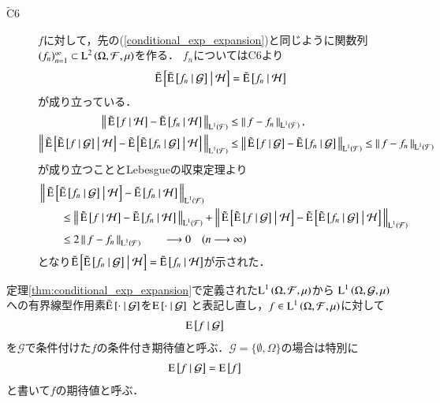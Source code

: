 \begin{prf}
\begin{description}
			\item[$\tilde{\mathrm{C}}$6]
				$f$に対して，先の(\ref{conditional_exp_expansion})と同じように関数列$(f_n)_{n=1}^{\infty} \subset \Lp{2}{\Omega,\mathcal{F},\mu}$を作る．
				$f_n$についてはC6より
				\begin{align}
					\tcexp{\tcexp{f_n}{\mathcal{G}}}{\mathcal{H}} = \tcexp{f_n}{\mathcal{H}}
				\end{align}
				が成り立っている．
				\begin{align}
					\Norm{ \tcexp{f}{\mathcal{H}} -  \tcexp{f_n}{\mathcal{H}}}{\Lp{1}{\mathcal{F}}}
					&\leq \Norm{f -  f_n}{\Lp{1}{\mathcal{F}}}, \\
					\Norm{ \tcexp{\tcexp{f}{\mathcal{G}}}{\mathcal{H}} -  \tcexp{\tcexp{f_n}{\mathcal{G}}}{\mathcal{H}}}{\Lp{1}{\mathcal{F}}}
					&\leq \Norm{ \tcexp{f}{\mathcal{G}} -  \tcexp{f_n}{\mathcal{G}} }{\Lp{1}{\mathcal{F}}}
					\leq \Norm{f -  f_n}{\Lp{1}{\mathcal{F}}}
				\end{align}
				が成り立つこととLebesgueの収束定理より
				\begin{align}
					&\Norm{ \tcexp{\tcexp{f_n}{\mathcal{G}}}{\mathcal{H}} - \tcexp{f_n}{\mathcal{H}} }{\Lp{1}{\mathcal{F}}} \\
					&\qquad\leq \Norm{ \tcexp{f}{\mathcal{H}} -  \tcexp{f_n}{\mathcal{H}}}{\Lp{1}{\mathcal{F}}}
						+ \Norm{ \tcexp{\tcexp{f}{\mathcal{G}}}{\mathcal{H}} -  \tcexp{\tcexp{f_n}{\mathcal{G}}}{\mathcal{H}}}{\Lp{1}{\mathcal{F}}} \\
					&\qquad \leq 2 \Norm{f -  f_n}{\Lp{1}{\mathcal{F}}} \qquad \longrightarrow 0 \quad (n \longrightarrow \infty)
				\end{align}
				となり$\tcexp{\tcexp{f_n}{\mathcal{G}}}{\mathcal{H}} = \tcexp{f_n}{\mathcal{H}}$が示された．
		\end{description}
		\QED
	\end{prf}
	
	\begin{itembox}[l]{}
		\begin{dfn}[条件付き期待値の再定義]
			定理\ref{thm:conditional_exp_expansion}で定義された$\Lp{1}{\Omega,\mathcal{F},\mu}$から
			$\Lp{1}{\Omega,\mathcal{G},\mu}$
			への有界線型作用素$\tcexp{\cdot}{\mathcal{G}}$を$\cexp{\cdot}{\mathcal{G}}$
			と表記し直し，$f \in \Lp{1}{\Omega,\mathcal{F},\mu}$に対して
			\begin{align}
				\cexp{f}{\mathcal{G}}
			\end{align}
			を$\mathcal{G}$で条件付けた$f$の条件付き期待値と呼ぶ．$\mathcal{G} = \{\emptyset, \Omega\}$の場合は特別に
			\begin{align}
				\cexp{f}{\mathcal{G}} = \Exp{f}
			\end{align}
			と書いて$f$の期待値と呼ぶ．
		\end{dfn}
	\end{itembox}